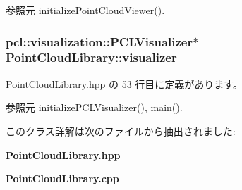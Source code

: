 参照元 initialize\-Point\-Cloud\-Viewer().

\subsubsection[{visualizer}]{\setlength{\rightskip}{0pt plus 5cm}pcl\-::visualization\-::\-P\-C\-L\-Visualizer$\ast$ Point\-Cloud\-Library\-::visualizer}\label{class_point_cloud_library_a00af6b104220e288f26c2d6f890ccd86}


 Point\-Cloud\-Library.\-hpp の 53 行目に定義があります。



参照元 initialize\-P\-C\-L\-Visualizer(), main().



このクラス詳解は次のファイルから抽出されました\-:\begin{DoxyCompactItemize}
\item 
{\bf Point\-Cloud\-Library.\-hpp}\item 
{\bf Point\-Cloud\-Library.\-cpp}\end{DoxyCompactItemize}

